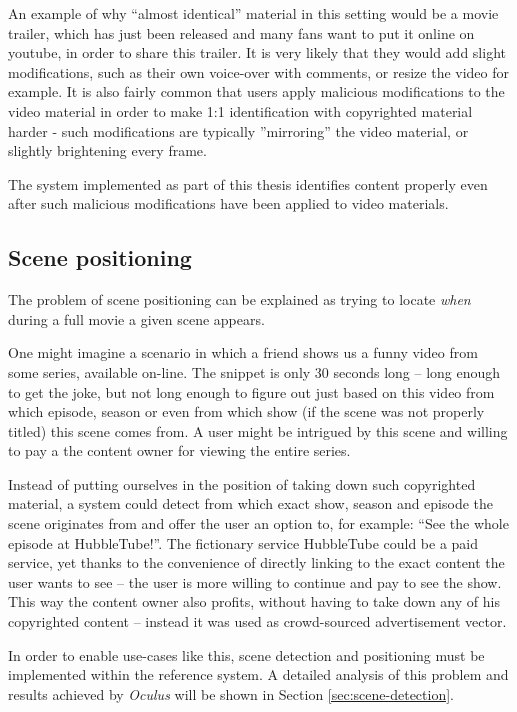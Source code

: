 An example of why ``almost identical'' material in this setting would be a movie trailer, which has just been released and many fans want to put it online on youtube, in order to share this trailer. It is very likely that they would add slight modifications, such as their own voice-over with comments, or resize the video for example. It is also fairly common that users apply malicious modifications to the video material in order to make 1:1 identification with copyrighted material harder - such modifications are typically ''mirroring'' the video material, or slightly brightening every frame.

The system implemented as part of this thesis identifies content properly even after such malicious modifications have been applied to video materials.


\subsection{Scene positioning}
\label{sec:goal-sub-movie}
The problem of scene positioning can be explained as trying to locate \textit{when} during a full movie a given scene appears.

One might imagine a scenario in which a friend shows us a funny video from some series, available on-line. The snippet is only 30 seconds long -- long enough to get the joke, but not long enough to figure out just based on this video from which episode, season or even from which show (if the scene was not properly titled) this scene comes from. A user might be intrigued by this scene and willing to pay a the content owner for viewing the entire series. 

Instead of putting ourselves in the position of taking down such copyrighted material, a system could detect from which exact show, season and episode the scene originates from and offer the user an option to, for example: ``See the whole episode at HubbleTube!''. The fictionary service HubbleTube could be a paid service, yet thanks to the convenience of directly linking to the exact content the user wants to see -- the user is more willing to continue and pay to see the show. This way the content owner also profits, without having to take down any of his copyrighted content -- instead it was used as crowd-sourced advertisement vector.

In order to enable use-cases like this, scene detection and positioning must be implemented within the reference system. A detailed analysis of this problem and results achieved by \textit{Oculus} will be shown in Section \ref{sec:scene-detection}.



